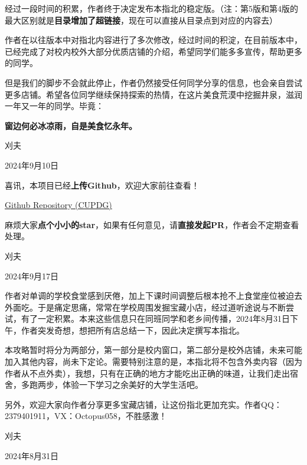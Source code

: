 \documentclass{ctexart}
\newcommand{\xw}[1]{{\CJKfamily{xw}#1}}
\begin{document}
经过一段时间的积累，作者终于决定发布本指北的稳定版。（注：第5版和第4版的最大区别就是\textbf{目录增加了超链接}，现在可以直接从目录点到对应的内容去）

作者在以往版本中对指北内容进行了多次修改，经过时间的积淀，在目前版本中，已经完成了对校内校外大部分优质店铺的介绍，希望同学们能多多宣传，帮助更多的同学。

但是我们的脚步不会就此停止，作者仍然接受任何同学分享的信息，也会亲自尝试更多店铺。希望各位同学继续保持探索的热情，在这片美食荒漠中挖掘井泉，滋润一年又一年的同学。毕竟：

\textbf{窗边何必冰凉雨，自是美食忆永年。}
\vspace{16.8pt}
\begin{flushright}
	\xw{刈夫}
	
	2024年9月10日
\end{flushright}

\vspace*{33.6pt}
喜讯，本项目已经\textbf{上传Github}，欢迎大家前往查看！

\href{https://github.com/Octopus058/China-University-of-Petroleum-Dining-Guide}{Github Repository (CUPDG)}

麻烦大家\textbf{点个小小的star}，如果有任何意见，请\textbf{直接发起PR}，作者会不定期查看处理。
\begin{flushright}
	\xw{刈夫}
	
	2024年9月17日
\end{flushright}
\newpage

\noindent{}
\setlength{\parindent}{2em} %

作者对单调的学校食堂感到厌倦，加上下课时间调整后根本抢不上食堂座位被迫去外面吃。于是痛定思痛，常常在学校周围发掘宝藏小店，经过道听途说与不断尝试，有了一定积累。本来这些信息只在同班同学和老乡间传播，2024年8月31日下午，作者突发奇想，想把所有店总结一下，因此决定撰写本指北。

本攻略暂时将分为两部分，第一部分是校内窗口，第二部分是校外店铺，未来可能加入其他内容，尚未下定论。需要特别注意的是，本指北将不包含外卖内容（因为作者从不点外卖），我想，只有在正确的地方才能吃出正确的味道，让我们走出宿舍，多跑两步，体验一下学习之余美好的大学生活吧。

另外，欢迎大家向作者分享更多宝藏店铺，让这份指北更加充实。作者QQ：2379401911，VX：Octopus058，不胜感激！
\vspace{16.8pt}
\begin{flushright}
	\xw{刈夫}
	
	2024年8月31日
\end{flushright}
\end{document}
